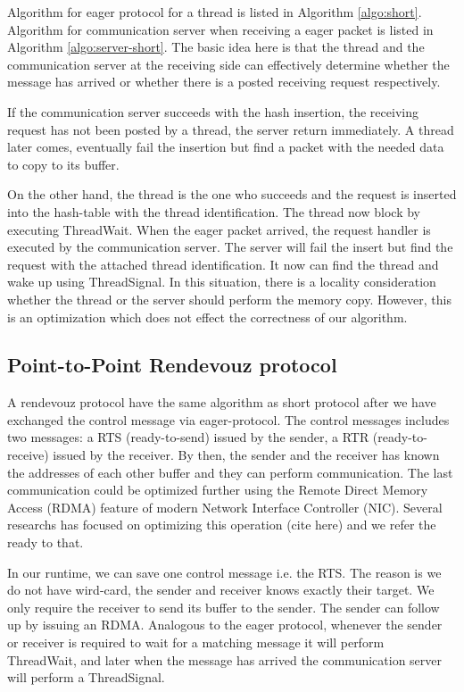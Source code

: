 \documentclass[11pt]{article}
\begin{document}
Algorithm for eager protocol for a thread is listed in Algorithm
\ref{algo:short}. Algorithm for communication server when receiving a eager 
packet is listed in Algorithm \ref{algo:server-short}. The basic idea here is
that the thread and the communication server at the receiving side can effectively
determine whether the message has arrived or whether there is a posted receiving
request respectively.

If the communication server succeeds with the hash insertion, the receiving
request has not been posted by a thread, the server return immediately. A
thread later comes, eventually fail the insertion but find a packet
with the needed data to copy to its buffer.

On the other hand, the thread is the one who succeeds and the request is
inserted into the hash-table with the thread identification. The thread now
block by executing ThreadWait. When the eager packet arrived, the request handler
is executed by the communication server. The server will fail the insert but
find the request with the attached thread identification. It now can 
find the thread and wake up using ThreadSignal. In this situation, there is a
locality consideration whether the thread or the server should perform the
memory copy. However, this is an optimization which does not effect the
correctness of our algorithm.

\subsection{Point-to-Point Rendevouz protocol}
A rendevouz protocol have the same algorithm as short protocol after we have
exchanged the control message via eager-protocol. The control messages 
includes two messages: a RTS (ready-to-send) issued by the sender, a RTR
(ready-to-receive) issued by the receiver. By then, the sender and the receiver
has known the addresses of each other buffer and they can perform
communication.  The last communication could be optimized further using the
Remote Direct Memory Access (RDMA) feature of modern Network Interface
Controller (NIC).  Several researchs has focused on optimizing this operation
(cite here) and we refer the ready to that.

In our runtime, we can save one control message i.e. the RTS.  The reason is
we do not have wird-card, the sender and receiver knows exactly their target.
We only require the receiver to send its buffer to the sender. The sender can
follow up by issuing an RDMA.  Analogous to the eager protocol, whenever the
sender or receiver is required to wait for a matching message it will perform
ThreadWait, and later when the message has arrived the communication server
will perform a ThreadSignal.
\end{document}

